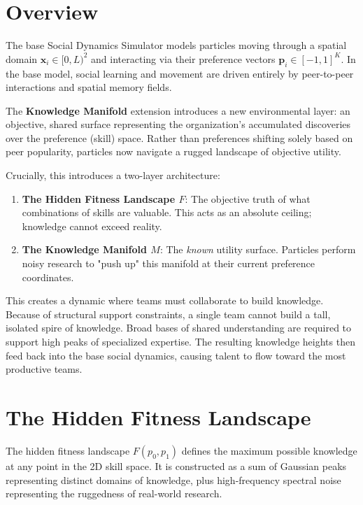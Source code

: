 \documentclass[11pt,a4paper]{article}
\begin{document}
\section{Overview}

The base Social Dynamics Simulator models particles moving through a spatial domain $\mathbf{x}_i \in [0, L)^2$ and interacting via their preference vectors $\mathbf{p}_i \in [-1, 1]^K$. In the base model, social learning and movement are driven entirely by peer-to-peer interactions and spatial memory fields.

The \textbf{Knowledge Manifold} extension introduces a new environmental layer: an objective, shared surface representing the organization's accumulated discoveries over the preference (skill) space. Rather than preferences shifting solely based on peer popularity, particles now navigate a rugged landscape of objective utility.

Crucially, this introduces a two-layer architecture:
\begin{enumerate}
    \item \textbf{The Hidden Fitness Landscape $F$}: The objective truth of what combinations of skills are valuable. This acts as an absolute ceiling; knowledge cannot exceed reality.
    \item \textbf{The Knowledge Manifold $M$}: The \textit{known} utility surface. Particles perform noisy research to "push up" this manifold at their current preference coordinates.
\end{enumerate}

This creates a dynamic where teams must collaborate to build knowledge. Because of structural support constraints, a single team cannot build a tall, isolated spire of knowledge. Broad bases of shared understanding are required to support high peaks of specialized expertise. The resulting knowledge heights then feed back into the base social dynamics, causing talent to flow toward the most productive teams.

\section{The Hidden Fitness Landscape}

The hidden fitness landscape $F(p_0, p_1)$ defines the maximum possible knowledge at any point in the 2D skill space. It is constructed as a sum of Gaussian peaks representing distinct domains of knowledge, plus high-frequency spectral noise representing the ruggedness of real-world research.
\end{document}
